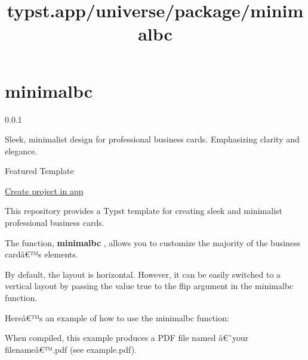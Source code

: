 \title{typst.app/universe/package/minimalbc}

\label{banner}
\label{template-thumbnail}

\section{minimalbc}\label{minimalbc}

{ 0.0.1 }

Sleek, minimalist design for professional business cards. Emphasizing
clarity and elegance.

{ } Featured Template

\href{/app?template=minimalbc&version=0.0.1}{Create project in app}

\label{readme}
This repository provides a Typst template for creating sleek and
minimalist professional business cards.

The function, \textbf{minimalbc} , allows you to customize the majority
of the business cardâ€™s elements.

By default, the layout is horizontal. However, it can be easily switched
to a vertical layout by passing the value true to the flip argument in
the minimalbc function.

Hereâ€™s an example of how to use the minimalbc function:

\begin{Shaded}
\begin{Highlighting}[]

\NormalTok{)}

\end{Highlighting}
\end{Shaded}

When compiled, this example produces a PDF file named â€˜your
filenameâ€™.pdf (see example.pdf).

